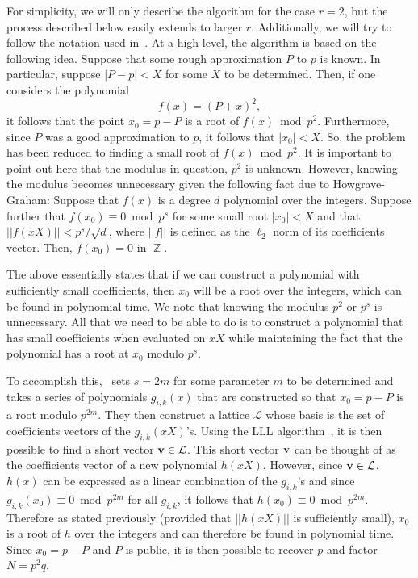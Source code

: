 \documentclass[letterpaper,twocolumn,10pt]{article}
\DeclareMathOperator{\Z}{\mathbb{Z}}
\begin{document}
For simplicity, we will only describe the algorithm for the case $r = 2$, but the process described below easily extends to larger $r$. Additionally, we will try to follow the notation used in~\cite{dan}. At a high level, the algorithm is based on the following idea. Suppose that some rough approximation $P$ to $p$ is known. In particular, suppose $|P - p| < X$ for some $X$ to be determined. Then, if one considers the polynomial
\[
f(x) = (P + x)^2,
\]  
it follows that the point $x_0 = p - P$ is a root of $f(x) \bmod p^2$. Furthermore, since $P$ was a good approximation to $p$, it follows that $|x_0| < X$. So, the problem has been reduced to finding a small root of $f(x) \bmod p^2$. It is important to point out here that the modulus in question, $p^2$ is unknown. However, knowing the modulus becomes unnecessary given the following fact due to Howgrave-Graham: Suppose that $f(x)$ is a degree $d$ polynomial over the integers. Suppose further that $f(x_0) \equiv 0 \bmod p^s$ for some small root $|x_0| < X$ and that $||f(xX)|| < p^s/\sqrt{d}$, where $||f||$ is defined as the $\ell_2$ norm of its coefficients vector. Then, $f(x_0) = 0$ in $\Z$. 

The above essentially states that if we can construct a polynomial with sufficiently small coefficients, then $x_0$ will be a root over the integers, which can be found in polynomial time. We note that knowing the modulus $p^2$ or $p^s$ is unnecessary. All that we need to be able to do is to construct a polynomial that has small coefficients when evaluated on $xX$ while maintaining the fact that the polynomial has a root at $x_0$ modulo $p^s$. 

To accomplish this,~\cite{dan} sets $s = 2m$ for some parameter $m$ to be determined and takes a series of polynomials $g_{i,k}(x)$ that are constructed so that $x_0 = p - P$ is a root modulo $p^{2m}$. They then construct a lattice $\mathcal{L}$ whose basis is the set of coefficients vectors of the $g_{i,k}(xX)$'s. Using the LLL algorithm~\cite{LLL}, it is then possible to find a short vector $\bf{v} \in \mathcal{L}$. This short vector $\bf{v}$ can be thought of as the coefficients vector of a new polynomial $h(xX)$. However, since $\bf{v} \in \mathcal{L}$, $h(x)$ can be expressed as a linear combination of the $g_{i,k}$'s and since $g_{i,k}(x_0) \equiv 0 \bmod p^{2m}$ for all $g_{i,k}$, it follows that $h(x_0) \equiv 0 \bmod p^{2m}$. Therefore as stated previously (provided that $||h(xX)||$ is sufficiently small), $x_0$ is a root of $h$ over the integers and can therefore be found in polynomial time. Since $x_0 = p-P$ and $P$ is public, it is then possible to recover $p$ and factor $N = p^2 q$. 
\end{document}
